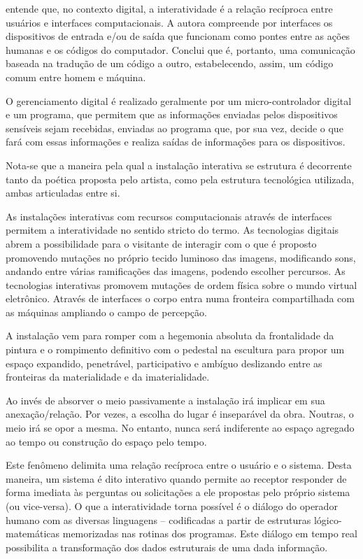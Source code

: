 entende que, no contexto digital, a interatividade é a relação recíproca entre usuários e interfaces computacionais. A autora compreende por interfaces os dispositivos de entrada e/ou de saída que funcionam como pontes entre as ações humanas e os códigos do computador. Conclui que é, portanto, uma comunicação baseada na tradução de um código a outro, estabelecendo, assim, um código comum entre homem e máquina. 

O gerenciamento digital é realizado geralmente por um micro-controlador digital e um programa, que permitem que as informações enviadas pelos dispositivos sensíveis sejam recebidas, enviadas ao programa que, por sua vez, decide o que fará com essas informações e realiza saídas de informações para os dispositivos. \cite[p. 66]{sogabe2011}

Nota-se que a maneira pela qual a instalação interativa se estrutura é decorrente tanto da poética proposta pelo artista, como pela estrutura tecnológica utilizada, ambas articuladas entre si. \cite[p. 6-7]{bochio}

As instalações interativas com recursos computacionais através de interfaces permitem
a interatividade no sentido stricto do termo. As tecnologias digitais abrem a
possibilidade para o visitante de interagir com o que é proposto promovendo mutações
no próprio tecido luminoso das imagens, modificando sons, andando entre várias
ramificações das imagens, podendo escolher percursos. As tecnologias interativas
promovem mutações de ordem física sobre o mundo virtual eletrônico. Através de
interfaces o corpo entra numa fronteira compartilhada com as máquinas ampliando o
campo de percepção. \cite{domingues1998}


A instalação vem para romper com a hegemonia absoluta da frontalidade da pintura
e o rompimento definitivo com o pedestal na escultura para propor um espaço expandido,
penetrável, participativo e ambíguo deslizando entre as fronteiras da materialidade
e da imaterialidade. \cite[p. 1130]{semeler2015}

Ao invés de absorver o meio passivamente a instalação irá implicar em sua anexação/relação.
Por vezes, a escolha do lugar é inseparável da obra. Noutras, o meio
irá se opor a mesma. No entanto, nunca será indiferente ao espaço agregado ao
tempo ou construção do espaço pelo tempo. \cite[p. 1130]{semeler2015}



Este fenômeno delimita uma relação recíproca entre o usuário e o sistema. Desta
maneira, um sistema é dito interativo quando permite ao receptor responder de forma
imediata às perguntas ou solicitações a ele propostas pelo próprio sistema (ou vice-versa). O que a interatividade torna possível é o diálogo do operador humano com as diversas linguagens – codificadas a partir de estruturas lógico-matemáticas memorizadas nas rotinas dos programas. Este diálogo em tempo real possibilita a transformação dos dados estruturais de uma dada informação. \cite{tavares}


